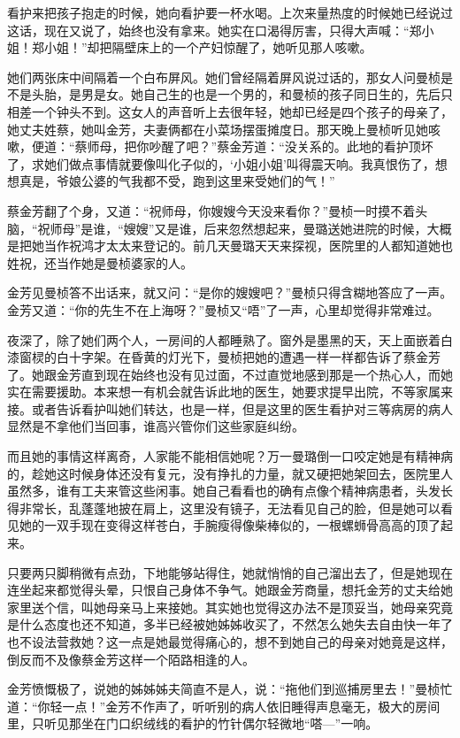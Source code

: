 \par 看护来把孩子抱走的时候，她向看护要一杯水喝。上次来量热度的时候她已经说过这话，现在又说了，始终也没有拿来。她实在口渴得厉害，只得大声喊：“郑小姐！郑小姐！”却把隔壁床上的一个产妇惊醒了，她听见那人咳嗽。
\par 她们两张床中间隔着一个白布屏风。她们曾经隔着屏风说过话的，那女人问曼桢是不是头胎，是男是女。她自己生的也是一个男的，和曼桢的孩子同日生的，先后只相差一个钟头不到。这女人的声音听上去很年轻，她却已经是四个孩子的母亲了，她丈夫姓蔡，她叫金芳，夫妻俩都在小菜场摆蛋摊度日。那天晚上曼桢听见她咳嗽，便道：“蔡师母，把你吵醒了吧？”蔡金芳道：“没关系的。此地的看护顶坏了，求她们做点事情就要像叫化子似的，‘小姐小姐’叫得震天响。我真恨伤了，想想真是，爷娘公婆的气我都不受，跑到这里来受她们的气！”
\par 蔡金芳翻了个身，又道：“祝师母，你嫂嫂今天没来看你？”曼桢一时摸不着头脑，“祝师母”是谁，“嫂嫂”又是谁，后来忽然想起来，曼璐送她进院的时候，大概是把她当作祝鸿才太太来登记的。前几天曼璐天天来探视，医院里的人都知道她也姓祝，还当作她是曼桢婆家的人。
\par 金芳见曼桢答不出话来，就又问：“是你的嫂嫂吧？”曼桢只得含糊地答应了一声。金芳又道：“你的先生不在上海呀？”曼桢又“唔”了一声，心里却觉得非常难过。
\par 夜深了，除了她们两个人，一房间的人都睡熟了。窗外是墨黑的天，天上面嵌着白漆窗棂的白十字架。在昏黄的灯光下，曼桢把她的遭遇一样一样都告诉了蔡金芳了。她跟金芳直到现在始终也没有见过面，不过直觉地感到那是一个热心人，而她实在需要援助。本来想一有机会就告诉此地的医生，她要求提早出院，不等家属来接。或者告诉看护叫她们转达，也是一样，但是这里的医生看护对三等病房的病人显然是不拿他们当回事，谁高兴管你们这些家庭纠纷。
\par 而且她的事情这样离奇，人家能不能相信她呢？万一曼璐倒一口咬定她是有精神病的，趁她这时候身体还没有复元，没有挣扎的力量，就又硬把她架回去，医院里人虽然多，谁有工夫来管这些闲事。她自己看看也的确有点像个精神病患者，头发长得非常长，乱蓬蓬地披在肩上，这里没有镜子，无法看见自己的脸，但是她可以看见她的一双手现在变得这样苍白，手腕瘦得像柴棒似的，一根螺蛳骨高高的顶了起来。
\par 只要两只脚稍微有点劲，下地能够站得住，她就悄悄的自己溜出去了，但是她现在连坐起来都觉得头晕，只恨自己身体不争气。她跟金芳商量，想托金芳的丈夫给她家里送个信，叫她母亲马上来接她。其实她也觉得这办法不是顶妥当，她母亲究竟是什么态度也还不知道，多半已经被她姊姊收买了，不然怎么她失去自由快一年了也不设法营救她？这一点是她最觉得痛心的，想不到她自己的母亲对她竟是这样，倒反而不及像蔡金芳这样一个陌路相逢的人。
\par 金芳愤慨极了，说她的姊姊姊夫简直不是人，说：“拖他们到巡捕房里去！”曼桢忙道：“你轻一点！”金芳不作声了，听听别的病人依旧睡得声息毫无，极大的房间里，只听见那坐在门口织绒线的看护的竹针偶尔轻微地“嗒—”一响。
